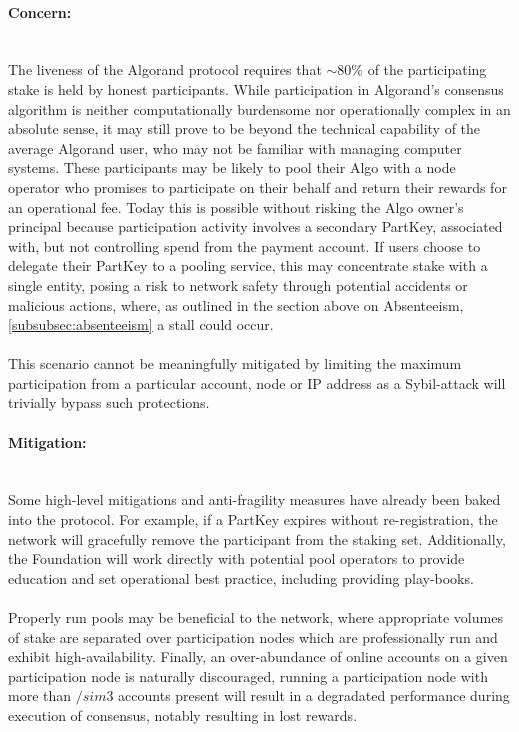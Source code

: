 \documentclass[11pt,a4paper]{article}
\begin{document}
\paragraph{Concern:} \mbox{}\\
The liveness of the Algorand protocol requires that $\sim$80\% of the participating stake is held by honest 
participants. While participation in Algorand's consensus algorithm is neither computationally burdensome nor 
operationally complex in an absolute sense, it may still prove to be beyond the technical capability of the average 
Algorand user, who may not be familiar with managing computer systems. These participants may be likely to pool their 
Algo with a node operator who promises to participate on their behalf and return their rewards for an operational fee. 
Today this is possible without risking the Algo owner’s principal because participation activity involves a secondary 
\gls{PartKey}, associated with, but not controlling spend from the payment account. If users choose to delegate their 
\gls{PartKey} to a pooling service, this may concentrate stake with a single entity, posing a risk to network safety 
through potential accidents or malicious actions, where, as outlined in the section above on Absenteeism, 
\ref{subsubsec:absenteeism} a stall could occur. \\ \\

This scenario cannot be meaningfully mitigated by limiting the maximum participation from a particular account, 
node or IP address as a Sybil-attack will trivially bypass such protections.

\paragraph{Mitigation:} \mbox{}\\
Some high-level mitigations and anti-fragility measures have already been baked into the protocol. For example, if a
\gls{PartKey} expires without re-registration, the network will gracefully remove the participant from the staking set.
Additionally, the Foundation will work directly with potential pool operators to provide education and set operational
best practice, including providing play-books. \\ \\
Properly run pools may be beneficial to the network, where appropriate volumes of stake are separated over
participation nodes which are professionally run and exhibit high-availability. Finally, an over-abundance of online 
accounts on a given participation node is naturally discouraged, running a participation node with more than $/sim$3 
accounts present will result in a degradated performance during execution of consensus, notably resulting in lost 
rewards.
\end{document}
